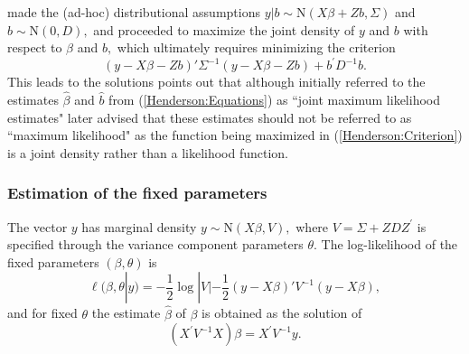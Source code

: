 \documentclass[12pt, a4paper]{report}
\theoremstyle{plain}
\theoremstyle{definition}
\theoremstyle{remark}
\begin{document}
\cite{Henderson:1950} made the (ad-hoc) distributional assumptions $y|b \sim \mathrm{N} (X \beta + Zb, \Sigma)$ and $b \sim \mathrm{N}(0,D),$ and proceeded to maximize the joint density of $y$ and $b$
with respect to $\beta$ and $b,$ which ultimately requires minimizing the criterion
\begin{equation}
(y - X \beta -Zb)'\Sigma^{-1}(y - X \beta -Zb) + b^\prime D^{-1}b. 
\label{Henderson:Criterion}
\end{equation}
This leads to the solutions
\cite{Robi:BLUP:1991} points out that although \cite{Henderson:1950} initially referred to the estimates $\hat{\beta}$ and $\hat{b}$ from (\ref{Henderson:Equations}) as ``joint maximum likelihood estimates" \cite{Henderson:1973} later advised that these estimates should not be referred to as ``maximum likelihood" as the function being maximized in (\ref{Henderson:Criterion}) is a joint density rather than a likelihood function.

\subsubsection*{Estimation of the fixed parameters}

The vector $y$ has marginal density $y \sim \mathrm{N}(X \beta,V),$ where $V = \Sigma + ZDZ^\prime$ is specified through the variance component parameters $\theta.$ The log-likelihood of the fixed parameters $(\beta, \theta)$ is
\begin{equation}
\ell (\beta, \theta|y) =
-\frac{1}{2} \log |V| -\frac{1}{2}(y -
X \beta)'V^{-1}(y -
X \beta), \label{Likelihood:MarginalModel}
\end{equation}
and for fixed $\theta$ the estimate $\hat{\beta}$ of $\beta$ is obtained as the solution of
\begin{equation}
(X^\prime V^{-1}X) {\beta} = X^\prime V^{-1}y.
\label{mle:beta:hat}
\end{equation} 
\end{document}

